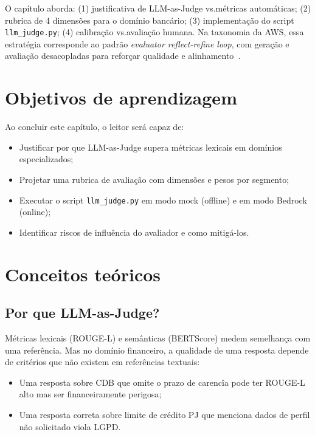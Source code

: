 O cap\'itulo aborda: (1) justificativa de LLM-as-Judge vs.\@ m\'etricas
autom\'aticas; (2) rubrica de 4 dimens\~oes para o dom\'inio banc\'ario;
(3) implementa\c{c}\~ao do script \texttt{llm\_judge.py}; (4) calibra\c{c}\~ao
vs.\@ avalia\c{c}\~ao humana. Na taxonomia da AWS, essa estrat\'egia corresponde
ao padr\~ao \textit{evaluator reflect-refine loop}, com gera\c{c}\~ao e avalia\c{c}\~ao
desacopladas para refor\c{c}ar qualidade e alinhamento~\cite{awsagentic2025}.

\section{Objetivos de aprendizagem}

Ao concluir este cap\'itulo, o leitor ser\'a capaz de:

\begin{itemize}[leftmargin=*]
  \item Justificar por que LLM-as-Judge supera m\'etricas lexicais
        em dom\'inios especializados;
  \item Projetar uma rubrica de avalia\c{c}\~ao com dimens\~oes e
        pesos por segmento;
  \item Executar o script \texttt{llm\_judge.py} em modo mock
        (offline) e em modo Bedrock (online);
  \item Identificar riscos de influ\^encia do avaliador e como
        miti\-g\'a-los.
\end{itemize}

\section{Conceitos te\'oricos}

\subsection{Por que LLM-as-Judge?}

M\'etricas lexicais (ROUGE-L) e sem\^anticas (BERTScore) medem
semelhan\c{c}a com uma refer\^encia. Mas no dom\'inio financeiro, a
qualidade de uma resposta depende de crit\'erios que n\~ao existem
em refer\^encias textuais:

\begin{itemize}[leftmargin=*]
  \item Uma resposta sobre CDB que omite o prazo de carenc\^ia pode
        ter ROUGE-L alto mas ser financeiramente perigosa;
  \item Uma resposta correta sobre limite de cr\'edito PJ que menciona
        dados de perfil n\~ao solicitado viola LGPD.
\end{itemize}

